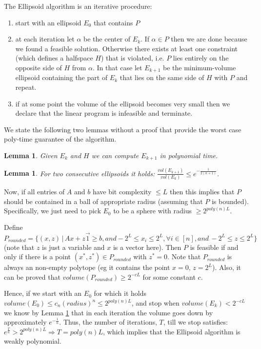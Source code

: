 \documentclass[11pt]{article}
\newtheorem{lemma}[theorem]{Lemma}
\begin{document}
\medskip

The Ellipsoid algorithm is an iterative procedure:
\vspace{-.3cm}
\begin{enumerate}
\item start with an ellipsoid $E_0$ that contains $P$
\item at each iteration let $\alpha$ be the center of $E_k$. If $\alpha \in P$ then we are done because we found a feasible solution. Otherwise there exists at least one constraint (which defines a halfspace $H$) that is violated, i.e. $P$ lies entirely on the opposite side of $H$ from $\alpha$. In that case let $E_{k+1}$ be the minimum-volume ellipsoid containing the part of $E_k$ that lies on the same side of $H$ with $P$ and repeat.
\item if at some point the volume of the ellipsoid becomes very small then we declare that the linear program is infeasible and terminate.
\end{enumerate}

We state the following two lemmas without a proof that provide the worst case poly-time guarantee of the algorithm.

\begin{lemma}
Given $E_k$ and $H$ we can compute $E_{k+1}$ in polynomial time.
\end{lemma}

\begin{lemma}\label{thm:l}
For two consecutive ellipsoids it holds: $\frac{vol(E_{k+1})}{vol(E_k)} \leq e^{-\frac{1}{2(n+1)}}$.
\end{lemma}


Now, if all entries of $A$ and $b$ have bit complexity $\leq L$ then this implies that $P$ should be contained in a ball of appropriate radius (assuming that $P$ is bounded). Specifically, we just need to pick $E_0$ to be a sphere with radius $\geq 2^{poly(n)L}$.

Define $P_{rounded} = \{(x, z)\,|\, Ax + z\vec{1} \geq b, and -2^{L} \leq x_i \leq 2^{L}, \forall i \in [n], and\, -2^{L} \leq z \leq 2^{L} \}$ (note that $z$ is just a variable and $x$ is a vector here). Then $P$ is feasible if and only if there is a point $(x^{*}, z^{*}) \in P_{rounded}$ with $z^{*} = 0$. Note that $P_{rounded}$ is always an non-empty polytope (eg it contains the point $x = 0, \, z = 2^L$). Also, it can be proved that $volume(P_{rounded}) \geq 2^{-cL}$ for some constant $c$.

Hence, if we start with an $E_0$ for which it holds $volume(E_0) \leq c_n (radius)^n \leq 2^{poly(n)L}$,  and stop when $volume(E_k) < 2^{-cL}$ we know by Lemma \ref{thm:l} that in each iteration the volume goes down by approximately $e^{-\frac{1}{n}}$. Thus, the number of iterations, $T$, till we stop satisfies: $e^{\frac{T}{n}} > 2^{poly(n)L} \Rightarrow T = poly(n)L$, which implies that the Ellipsoid algorithm is weakly polynomial.
\end{document}
